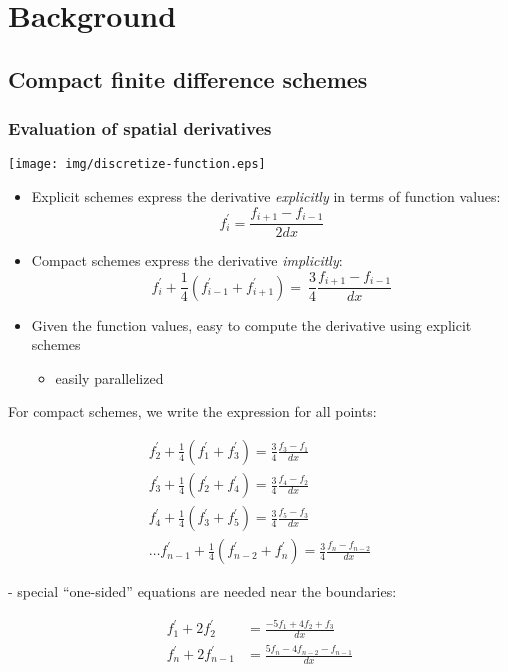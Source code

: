 \section{Background}

\subsection{Compact finite difference schemes}

\begin{frame}
\frametitle{Evaluation of spatial derivatives}
\pause
\centering
\texttt{[image: img/discretize-function.eps]}
\begin{itemize}[<+->]
    \item {Explicit schemes express
        the derivative \emph{explicitly}
        in terms of function values:
        \begin{equation*}
            f_i^\prime = \frac{f_{i+1} - f_{i-1}}{2dx}
        \end{equation*}
        }
    \item {Compact schemes express
        the derivative \emph{implicitly}:
        \begin{equation*}
            f_i^{\prime} + \frac{1}{4}(f^{\prime}_{i-1} + f^{\prime}_{i+1}) = \
            \frac{3}{4}\frac{f_{i+1} - f_{i-1}}{dx}
        \end{equation*}
        }
    \item Given the function values,
        easy to compute the derivative using explicit schemes
    \begin{itemize}
        \item easily parallelized
    \end{itemize}
\end{itemize}
\end{frame}

\begin{frame}
For compact schemes,
we write the expression for all points:

\begin{align*}
f_2^{\prime} + \frac{1}{4}(f^{\prime}_{1} + f^{\prime}_{3}) =
    \frac{3}{4}\frac{f_{3} - f_{1}}{dx} \\
%
f_3^{\prime} + \frac{1}{4}(f^{\prime}_{2} + f^{\prime}_{4}) =
    \frac{3}{4}\frac{f_{4} - f_{2}}{dx} \\
%
f_4^{\prime} + \frac{1}{4}(f^{\prime}_{3} + f^{\prime}_{5})
    = \frac{3}{4}\frac{f_{5} - f_{3}}{dx} \\
%
\hdots
%
f_{n-1}^{\prime} + \frac{1}{4}(f^{\prime}_{n-2} + f^{\prime}_{n})
    = \frac{3}{4}\frac{f_{n} - f_{n-2}}{dx}
\end{align*}

- special ``one-sided'' equations are needed near the boundaries:

\begin{align*}
f^{\prime}_1 + 2f^{\prime}_2 &= \frac{-5f_1 + 4f_2 + f_3}{dx} \\
%
f^{\prime}_{n} + 2f^{\prime}_{n-1}
&=
\frac{5f_{n} - 4f_{n-2} -  f_{n-1}}{dx}
\end{align*}
\end{frame}

